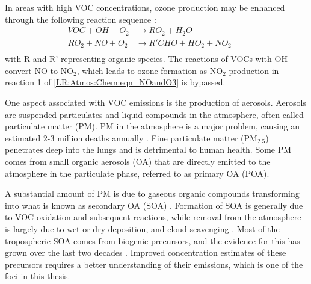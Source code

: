   
  
  In areas with high VOC concentrations, ozone production may be enhanced through the following reaction sequence \parencite{Sillman1999}:
  \begin{equation}
    \begin{aligned}
      VOC + OH + O_2   & \to RO_2 + H_2O       && \\%
      RO_2 + NO + O_2  & \to R'CHO+HO_2+NO_2   && \\%
    \end{aligned}
    \label{LR:VOCs:eqn_VOCandNO}
  \end{equation}
  with R and R' representing organic species.
  The reactions of VOCs with OH convert NO to NO$_2$, which leads to ozone formation as NO$_2$ production in reaction 1 of \ref{LR:Atmos:Chem:eqn_NOandO3} is bypassed.
  
  One aspect associated with VOC emissions is the production of aerosols.
  Aerosols are suspended particulates and liquid compounds in the atmosphere, often called particulate matter (PM).
  PM in the atmosphere is a major problem, causing an estimated 2-3 million 
  deaths annually \parencite{Avnery2011, Hoek2013, Krewski2009, Silva2013, 
  Lelieveld2015}. 
  Fine particulate matter (PM$_{2.5}$) penetrates deep into the lungs and is detrimental to human health.
  Some PM comes from small organic aerosols (OA) that are directly emitted to 
  the atmosphere in the particulate phase, referred to as primary OA (POA).
  
  A substantial amount of PM is due to gaseous organic compounds transforming 
  into what is known as secondary OA (SOA) \parencite{Atkinson2000, 
  Kanakidou2005,Kroll2008}.
  Formation of SOA is generally due to VOC oxidation and subsequent reactions, while removal from the atmosphere is largely due to wet or dry deposition, and cloud scavenging \parencite{Kanakidou2005}.
  Most of the tropospheric SOA comes from biogenic precursors, and the evidence 
  for this has grown over the last two decades \parencite{Guenther1995, 
  Kanakidou2005,Guenther2012}.
  Improved concentration estimates of these precursors requires a better understanding of their emissions, which is one of the foci in this thesis.
  
